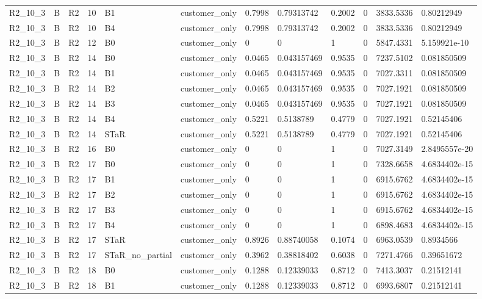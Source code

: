 \begin{longtable}{llllllllllll}
R2\_10\_3 & B & R2 & 10 & B1 & customer\_only & 0.7998 & 0.79313742 & 0.2002 & 0 & 3833.5336 & 0.80212949 \\
R2\_10\_3 & B & R2 & 10 & B4 & customer\_only & 0.7998 & 0.79313742 & 0.2002 & 0 & 3833.5336 & 0.80212949 \\
R2\_10\_3 & B & R2 & 12 & B0 & customer\_only & 0 & 0 & 1 & 0 & 5847.4331 & 5.159921e-10 \\
R2\_10\_3 & B & R2 & 14 & B0 & customer\_only & 0.0465 & 0.043157469 & 0.9535 & 0 & 7237.5102 & 0.081850509 \\
R2\_10\_3 & B & R2 & 14 & B1 & customer\_only & 0.0465 & 0.043157469 & 0.9535 & 0 & 7027.3311 & 0.081850509 \\
R2\_10\_3 & B & R2 & 14 & B2 & customer\_only & 0.0465 & 0.043157469 & 0.9535 & 0 & 7027.1921 & 0.081850509 \\
R2\_10\_3 & B & R2 & 14 & B3 & customer\_only & 0.0465 & 0.043157469 & 0.9535 & 0 & 7027.1921 & 0.081850509 \\
R2\_10\_3 & B & R2 & 14 & B4 & customer\_only & 0.5221 & 0.5138789 & 0.4779 & 0 & 7027.1921 & 0.52145406 \\
R2\_10\_3 & B & R2 & 14 & STaR & customer\_only & 0.5221 & 0.5138789 & 0.4779 & 0 & 7027.1921 & 0.52145406 \\
R2\_10\_3 & B & R2 & 16 & B0 & customer\_only & 0 & 0 & 1 & 0 & 7027.3149 & 2.8495557e-20 \\
R2\_10\_3 & B & R2 & 17 & B0 & customer\_only & 0 & 0 & 1 & 0 & 7328.6658 & 4.6834402e-15 \\
R2\_10\_3 & B & R2 & 17 & B1 & customer\_only & 0 & 0 & 1 & 0 & 6915.6762 & 4.6834402e-15 \\
R2\_10\_3 & B & R2 & 17 & B2 & customer\_only & 0 & 0 & 1 & 0 & 6915.6762 & 4.6834402e-15 \\
R2\_10\_3 & B & R2 & 17 & B3 & customer\_only & 0 & 0 & 1 & 0 & 6915.6762 & 4.6834402e-15 \\
R2\_10\_3 & B & R2 & 17 & B4 & customer\_only & 0 & 0 & 1 & 0 & 6898.4683 & 4.6834402e-15 \\
R2\_10\_3 & B & R2 & 17 & STaR & customer\_only & 0.8926 & 0.88740058 & 0.1074 & 0 & 6963.0539 & 0.8934566 \\
R2\_10\_3 & B & R2 & 17 & STaR\_no\_partial & customer\_only & 0.3962 & 0.38818402 & 0.6038 & 0 & 7271.4766 & 0.39651672 \\
R2\_10\_3 & B & R2 & 18 & B0 & customer\_only & 0.1288 & 0.12339033 & 0.8712 & 0 & 7413.3037 & 0.21512141 \\
R2\_10\_3 & B & R2 & 18 & B1 & customer\_only & 0.1288 & 0.12339033 & 0.8712 & 0 & 6993.6807 & 0.21512141 \\

\end{longtable}
